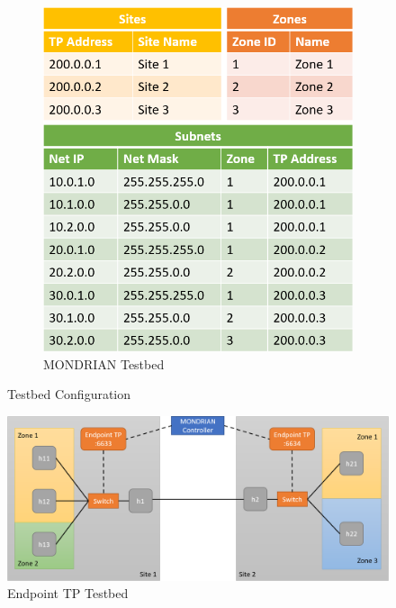 \begin{figure}
    \begin{subfigure}[t]{.49\textwidth}
      \centering
      \includegraphics[width=\linewidth]{img/Mondrian_Testbed_Data.png}
      \caption{MONDRIAN Testbed}
      \label{fig:sub: MONDRIAN Testbed}
    \end{subfigure}
    \caption{Testbed Configuration}
    \label{fig:Testbed Configuration}
\end{figure}


\begin{figure}[h]
    \centering
    \includegraphics[width =\textwidth]{img/Endpoint_TP_testbed.png}
    \caption{Endpoint \acs{TP} Testbed}
    \label{Endpoint TP Testbed}
\end{figure}

